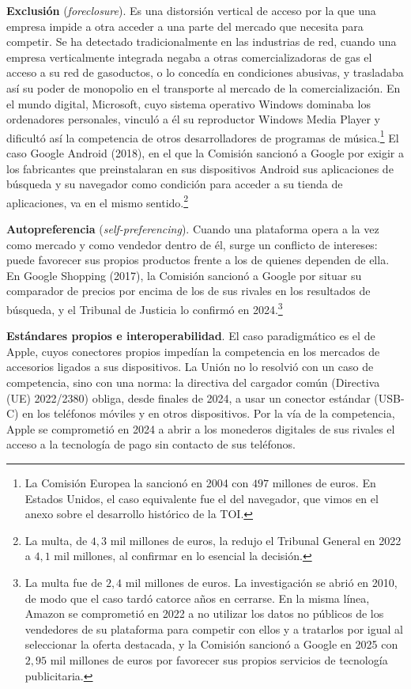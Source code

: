 \documentclass[10pt,a4paper]{article}
\newcounter{anexo}
\begin{document}
\textbf{Exclusión} (\textit{foreclosure}). Es una distorsión vertical de acceso por la que una empresa impide a otra acceder a una parte del mercado que necesita para competir. Se ha detectado tradicionalmente en las industrias de red, cuando una empresa verticalmente integrada negaba a otras comercializadoras de gas el acceso a su red de gasoductos, o lo concedía en condiciones abusivas, y trasladaba así su poder de monopolio en el transporte al mercado de la comercialización. En el mundo digital, Microsoft, cuyo sistema operativo Windows dominaba los ordenadores personales, vinculó a él su reproductor Windows Media Player y dificultó así la competencia de otros desarrolladores de programas de música.\footnote{%
    La Comisión Europea la sancionó en 2004 con $497$ millones de euros. En Estados Unidos, el caso equivalente fue el del navegador, que vimos en el anexo sobre el desarrollo histórico de la TOI.
} El caso Google Android (2018), en el que la Comisión sancionó a Google por exigir a los fabricantes que preinstalaran en sus dispositivos Android sus aplicaciones de búsqueda y su navegador como condición para acceder a su tienda de aplicaciones, va en el mismo sentido.\footnote{%
    La multa, de $4,3$ mil millones de euros, la redujo el Tribunal General en 2022 a $4,1$ mil millones, al confirmar en lo esencial la decisión.
}

\textbf{Autopreferencia} (\textit{self-preferencing}). Cuando una plataforma opera a la vez como mercado y como vendedor dentro de él, surge un conflicto de intereses: puede favorecer sus propios productos frente a los de quienes dependen de ella. En Google Shopping (2017), la Comisión sancionó a Google por situar su comparador de precios por encima de los de sus rivales en los resultados de búsqueda, y el Tribunal de Justicia lo confirmó en 2024.\footnote{%
    La multa fue de $2,4$ mil millones de euros. La investigación se abrió en 2010, de modo que el caso tardó catorce años en cerrarse. En la misma línea, Amazon se comprometió en 2022 a no utilizar los datos no públicos de los vendedores de su plataforma para competir con ellos y a tratarlos por igual al seleccionar la oferta destacada, y la Comisión sancionó a Google en 2025 con $2,95$ mil millones de euros por favorecer sus propios servicios de tecnología publicitaria.
}

\textbf{Estándares propios e interoperabilidad}. El caso paradigmático es el de Apple, cuyos conectores propios impedían la competencia en los mercados de accesorios ligados a sus dispositivos. La Unión no lo resolvió con un caso de competencia, sino con una norma: la directiva del cargador común (Directiva (UE) 2022/2380) obliga, desde finales de 2024, a usar un conector estándar (USB-C) en los teléfonos móviles y en otros dispositivos. Por la vía de la competencia, Apple se comprometió en 2024 a abrir a los monederos digitales de sus rivales el acceso a la tecnología de pago sin contacto de sus teléfonos.
\end{document}
